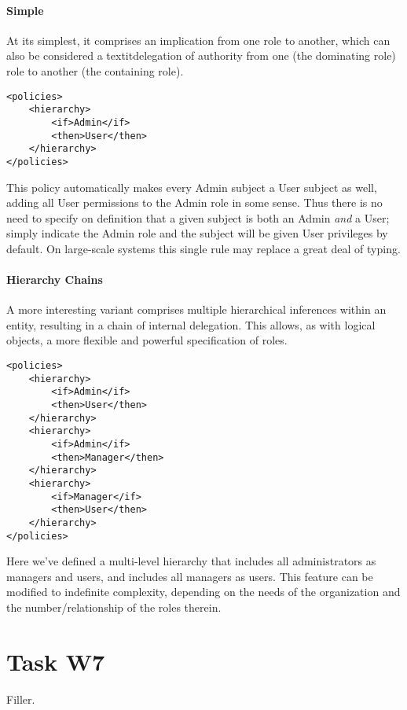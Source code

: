 \documentclass{article}
\begin{document}
\paragraph{Simple}
At its simplest, it comprises an implication from one role to another, which can also be considered a textit{delegation} of authority from one (the dominating role) role to another (the containing role).
\begin{lstlisting}
<policies>
    <hierarchy>
        <if>Admin</if>
        <then>User</then>
    </hierarchy>
</policies>
\end{lstlisting}
This policy automatically makes every Admin subject a User subject as well, adding all User permissions to the Admin role in some sense. Thus there is no need to specify on definition that a given subject is both an Admin \textit{and} a User; simply indicate the Admin role and the subject will be given User privileges by default. On large-scale systems this single rule may replace a great deal of typing.

\paragraph{Hierarchy Chains}
A more interesting variant comprises multiple hierarchical inferences within an entity, resulting in a chain of internal delegation. This allows, as with logical objects, a more flexible and powerful specification of roles.
\begin{lstlisting}
<policies>
    <hierarchy>
        <if>Admin</if>
        <then>User</then>
    </hierarchy>
    <hierarchy>
        <if>Admin</if>
        <then>Manager</then>
    </hierarchy>
    <hierarchy>
        <if>Manager</if>
        <then>User</then>
    </hierarchy>
</policies>
\end{lstlisting}
Here we've defined a multi-level hierarchy that includes all administrators as managers and users, and includes all managers as users.
This feature can be modified to indefinite complexity, depending on the needs of the organization and the number/relationship of the roles therein. \\

\section{Task W7}
Filler.

\pagebreak

\printbibliography[heading=bibintoc]
\end{document}
